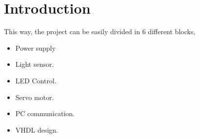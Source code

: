
\section{Introduction}

This way, the project can be easily divided in 6 different blocks,

\begin{itemize}
\item Power supply
\item Light sensor.
\item LED Control.
\item Servo motor.
\item PC communication.
\item VHDL design.
\end{itemize}
	